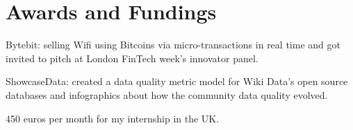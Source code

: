 \documentclass[]{deedy-resume-openfont}
\begin{document}
\begin{minipage}[t]{0.66\textwidth}
%
%
%


\section{Awards and Fundings} 
\begin{tightemize}
\item Bytebit: selling Wifi using Bitcoins via micro-transactions in real time 
 and got invited to pitch at London FinTech week's innovator panel.
\end{tightemize}

\sectionsep

\begin{verytightemize}
\item ShowcaseData: created a data quality metric model for Wiki Data's open source databases
and infographics about how the community data quality evolved.
\end{verytightemize}

\sectionsep
{}
\begin{verytightemize}
\item 450 euros per month for my internship in the UK.
\end{verytightemize}


\end{minipage}
\end{document}
